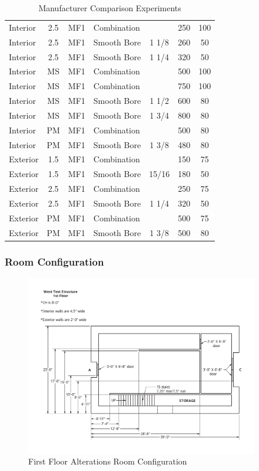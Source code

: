 \documentclass{article}
\begin{document}
\begin{table}[]
\begin{tabular}{|lcclccc|}
Interior & 2.5 & MF1 & Combination &  & 250 & 100 \\
Interior & 2.5 & MF1 & Smooth Bore & 1 1/8 & 260 & 50 \\
Interior & 2.5 & MF1 & Smooth Bore & 1 1/4 & 320 & 50 \\
Interior & MS & MF1 & Combination &  & 500 & 100 \\
Interior & MS & MF1 & Combination &  & 750 & 100 \\
Interior & MS & MF1 & Smooth Bore & 1 1/2 & 600 & 80 \\
Interior & MS & MF1 & Smooth Bore & 1 3/4 & 800 & 80 \\
Interior & PM & MF1 & Combination &  & 500 & 80 \\
Interior & PM & MF1 & Smooth Bore & 1 3/8 & 480 & 80 \\
Exterior & 1.5 & MF1 & Combination &  & 150 & 75 \\
Exterior & 1.5 & MF1 & Smooth Bore & 15/16 & 180 & 50 \\
Exterior & 2.5 & MF1 & Combination &  & 250 & 75 \\
Exterior & 2.5 & MF1 & Smooth Bore & 1 1/4 & 320 & 50 \\
Exterior & PM & MF1 & Combination &  & 500 & 75 \\
Exterior & PM & MF1 & Smooth Bore & 1 3/8 & 500 & 80 \\ \hline
\end{tabular}
\caption{Manufacturer Comparison Experiments}
\label{Manufacturer_Comparison_Experiments}
\end{table}

\subsubsection{Room Configuration}

\begin{figure}[!ht]
	\centering
	\includegraphics[width=4in]{Figures/Air_Entrainment/West_Test_Structure_1st_Floor_nodim.pdf}
	\caption{First Floor Alterations Room Configuration}
	\label{fig:First_Floor_Alterations_Room_Configuration}
\end{figure}
\end{document}
